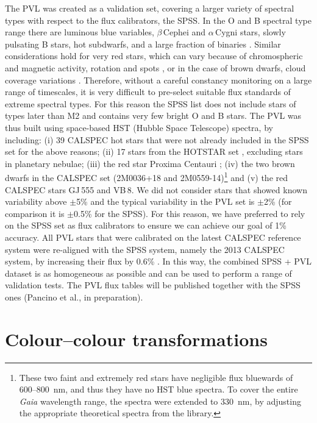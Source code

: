 \documentclass{aa}
\begin{document}
\begin{appendix}
The PVL was created as a validation set, covering a larger variety of spectral types with respect to the flux calibrators, the SPSS. In the O and B spectral type range there are luminous blue variables, $\beta$\,Cephei and $\alpha$\,Cygni stars, slowly pulsating B stars, hot subdwarfs, and a large fraction of binaries \citep{2019A&A...623A.110G,2017PASA...34....1D}. Similar considerations hold for very red stars, which can vary because of chromospheric and magnetic activity, rotation and spots \citep{2019ApJ...879..114I}, or in the case of brown dwarfs, cloud coverage variations \citep{2018haex.bookE..94A}. Therefore, without a careful constancy monitoring on a large range of timescales, it is very difficult to pre-select suitable flux standards of extreme spectral types. For this reason the SPSS list does not include stars of types later than M2 and contains very few bright O and B stars. The PVL was thus built using space-based HST (Hubble Space Telescope) spectra, by including: (i) 39 CALSPEC hot stars that were not already included in the SPSS set for the above reasons; (ii) 17 stars from the HOTSTAR set \citep{khan18}, excluding stars in planetary nebulae; (iii) the red star Proxima Centauri \citep{ribas17}; (iv) the two brown dwarfs in the CALSPEC set (2M0036+18 and 2M0559-14)\footnote{These two faint and extremely red stars have negligible flux bluewards of 600--800~nm, and thus they have no HST blue spectra. To cover the entire {\em Gaia} wavelength range, the spectra were extended to 330~nm, by adjusting the appropriate theoretical spectra from the \citet{2012RSPTA.370.2765A} library.} and (v) the red CALSPEC stars GJ\,555 and VB\,8. We did not consider stars that showed known variability above $\pm$5\% and the typical variability in the PVL set is $\pm$2\% (for comparison it is $\pm$0.5\% for the SPSS). For this reason, we have preferred to rely on the SPSS set as flux calibrators to ensure we can achieve our goal of 1\% accuracy. All PVL stars that were calibrated on the latest CALSPEC reference system were re-aligned with the SPSS system, namely the 2013 CALSPEC system, by increasing their flux by 0.6\% \citep{bohlin14}. In this way, the combined SPSS + PVL dataset is as homogeneous as possible and can be used to perform a range of validation tests. The PVL flux tables will be published together with the SPSS ones (Pancino et al., in preparation).

\section{Colour--colour transformations}\label{sec:cctran}
\newcommand{\gminr}{\ensuremath{G-G_{\rm RP}}\xspace}
\newcommand{\bming}{\ensuremath{G_{\rm BP}-G}\xspace}
\def\gmag{\ensuremath{G}\xspace}
\newcommand{\hip}{Hipparcos\xspace}
\newcommand{\tyctwo}{Tycho-2\xspace}


\end{appendix}
\end{document}
